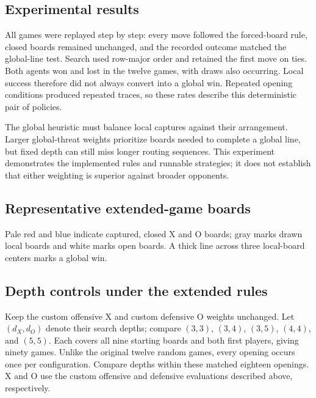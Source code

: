 \documentclass[UTF8,fontset=fandol,11pt,a4paper]{ctexart}
\begin{document}
\clearpage
\subsection{Experimental results}


\begin{table}[htbp]
  \centering\small
  \caption{Global-line results. Capture counts refer to won local boards at termination.}
  
\end{table}

All games were replayed step by step: every move followed the forced-board
rule, closed boards remained unchanged, and the recorded outcome matched
the global-line test. Search used row-major order and retained the first
move on ties. Both agents won and lost in the twelve games, with draws
also occurring. Local success therefore did not always convert into a
global win. Repeated opening conditions produced repeated traces, so
these rates describe this deterministic pair of policies.

The global heuristic must balance local captures against their arrangement.
Larger global-threat weights prioritize boards needed to complete a global
line, but fixed depth can still miss longer routing sequences. This
experiment demonstrates the implemented rules and runnable strategies;
it does not establish that either weighting is superior against broader opponents.

\clearpage
\subsection{Representative extended-game boards}


Pale red and blue indicate captured, closed X and O boards; gray marks
drawn local boards and white marks open boards. A thick line across
three local-board centers marks a global win.



\clearpage
\subsection{Depth controls under the extended rules}
Keep the custom offensive X and custom defensive O weights unchanged.
Let $(d_X,d_O)$ denote their search depths; compare $(3,3)$, $(3,4)$,
$(3,5)$, $(4,4)$, and $(5,5)$. Each covers all nine starting boards
and both first players, giving ninety games. Unlike the original twelve
random games, every opening occurs once per configuration. Compare depths
within these matched eighteen openings. X and O use the custom offensive
and defensive evaluations described above, respectively.
\end{document}
